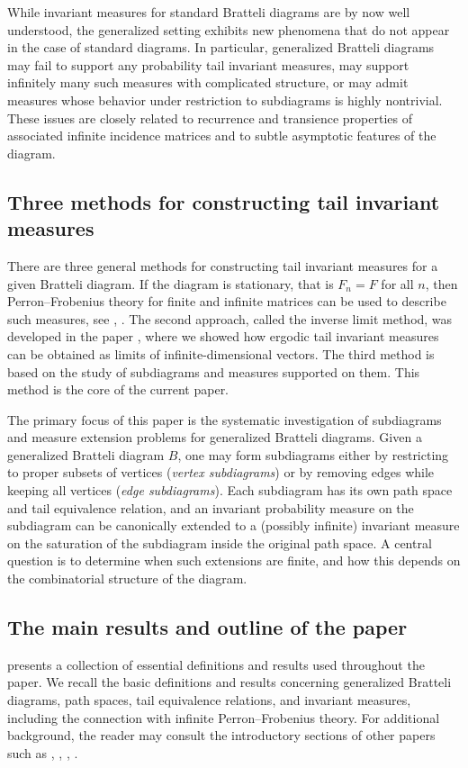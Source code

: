 \documentclass[11pt,reqno]{amsart}
\theoremstyle{definition}
\theoremstyle{remark}
\theoremstyle{plain}
\numberwithin{equation}{section}
\begin{document}
While invariant measures for standard Bratteli diagrams are by now well understood, the generalized setting exhibits new phenomena that do not appear in the case of standard diagrams. In particular, generalized Bratteli diagrams may fail to support any probability tail invariant measures, may support infinitely many such measures with complicated structure, or may admit measures whose behavior under restriction to subdiagrams is highly nontrivial. These issues are closely related to recurrence and transience properties of associated infinite incidence matrices and to subtle asymptotic features of the diagram.

\subsection{Three methods for constructing tail invariant measures}
There are three general methods for constructing tail invariant measures for a given Bratteli diagram.
 If the diagram is stationary, that is $F_n = F$ for all $n$, 
 then Perron–Frobenius theory for finite and infinite matrices 
 can be used to describe such measures, see \cite{BezuglyiKwiatkowskiMedynetsSolomyak2010}, \cite{BezuglyiJorgensenKarpelSanadhya2025}. The second approach, called the inverse limit method, was developed in the paper 
\cite{BezuglyiKarpelKwiatkowskiWata2024}, where we showed how ergodic tail invariant measures can be obtained as limits of infinite-dimensional vectors.
 The third method is based on the study of subdiagrams and measures supported on them. This method is the core of the current paper. 

The primary focus of this paper is the systematic investigation of subdiagrams and measure extension problems for generalized Bratteli diagrams. Given a generalized Bratteli diagram 
$B$, one may form subdiagrams either by restricting to proper subsets of vertices (\textit{vertex subdiagrams}) or by removing edges while keeping all vertices (\textit{edge subdiagrams}). Each subdiagram has its own path space and tail equivalence relation, and an invariant probability measure on the subdiagram can be canonically extended to a (possibly infinite) invariant measure on the saturation of the subdiagram inside the original path space. A central question is to determine when such extensions are finite, and how this depends on the combinatorial structure of the diagram. 

\subsection{The main results and outline of the paper}  presents a collection of essential definitions and results used throughout the paper. We recall the basic definitions and results concerning generalized Bratteli diagrams, path spaces, tail equivalence relations, and invariant measures, including the connection with infinite Perron–Frobenius theory. For additional background, the reader may consult the introductory sections of other papers such as \cite{BezuglyiKarpel2016}, \cite{BezuglyiKarpel_2020}, 
\cite{BezuglyiKarpelKwiatkowskiWata2024}, \cite{BezuglyiJorgensenKarpelSanadhya2025}.
\end{document}
